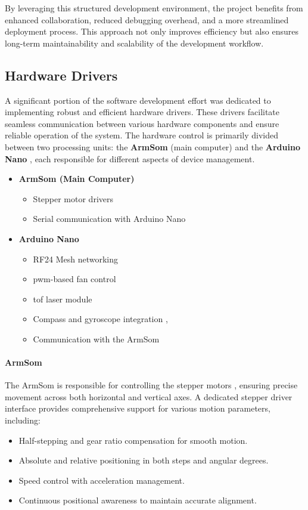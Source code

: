 By leveraging this structured development environment, the project benefits from enhanced collaboration, reduced debugging overhead, and a more streamlined deployment process. This approach not only improves efficiency but also ensures long-term maintainability and scalability of the development workflow.  

\subsection{Hardware Drivers}
A significant portion of the software development effort was dedicated to implementing robust and efficient hardware drivers. These drivers facilitate seamless communication between various hardware components and ensure reliable operation of the system. The hardware control is primarily divided between two processing units: the \textbf{ArmSom} (main computer) \cite{armsom_sige7} and the \textbf{Arduino Nano} \cite{arduino_nano_dfrobot}, each responsible for different aspects of device management.

\begin{itemize}
	\item \textbf{ArmSom (Main Computer)}
	\begin{itemize}
		\item Stepper motor drivers \cite{angeek_28byj_48}
		\item Serial communication with Arduino Nano
	\end{itemize}
	\item \textbf{Arduino Nano}
	\begin{itemize}
		\item RF24 Mesh networking \cite{nRF24L01, nRF24L01_plus}
		\item \acrfull{pwm}-based fan control \cite{noctua_fan_nf_a8}
		\item \acrshort{tof} laser module \cite{dfrobot_ir_sensor}
		\item Compass and gyroscope integration \cite{azdelivery_gy_271, azdelivery_gy_521},
		\item Communication with the ArmSom
	\end{itemize}
\end{itemize}

\paragraph{ArmSom}
The ArmSom \cite{armsom_sige7} is responsible for controlling the stepper motors \cite{angeek_28byj_48}, ensuring precise movement across both horizontal and vertical axes. A dedicated stepper driver interface provides comprehensive support for various motion parameters, including:
\begin{itemize}
	\item Half-stepping and gear ratio compensation for smooth motion.
	\item Absolute and relative positioning in both steps and angular degrees.
	\item Speed control with acceleration management.
	\item Continuous positional awareness to maintain accurate alignment.
\end{itemize}

